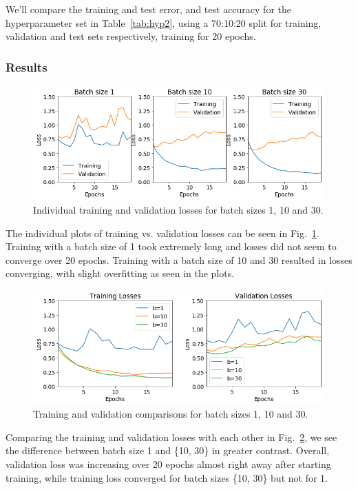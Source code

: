 \documentclass[twocolumn, 9pt]{article}
\begin{document}
We'll compare the training and test error, and test accuracy for the
hyperparameter set in Table~\ref{tab:hyp2}, using a 70:10:20 split for
training, validation and test sets respectively, training for 20 epochs.

\subsubsection*{Results}

\begin{figure}[htbp]
	\centering
	\includegraphics[width=\columnwidth]{lossacc.png}
	\caption{Individual training and validation losses for batch sizes 1, 10 and 30.}
	\label{fig:indiv}
\end{figure}

The individual plots of training vs. validation losses can be seen in Fig.~\ref{fig:indiv}.
Training with a batch size of 1 took extremely long and losses did not seem to converge
over 20 epochs. Training with a batch size of 10 and 30 resulted in losses converging,
with slight overfitting as seen in the plots.

\begin{figure}[htbp]
	\centering
	\includegraphics[width=\columnwidth]{valloss.png}
	\caption{Training and validation comparisons for batch sizes 1, 10 and 30.}
	\label{fig:compare}
\end{figure}

Comparing the training and validation losses with each other in Fig.~\ref{fig:compare},
we see the difference between batch size 1 and \{10, 30\} in greater contrast. Overall,
validation loss was increasing over 20 epochs almost right away after starting training,
while training loss converged for batch sizes \{10, 30\} but not for 1.
\end{document}
